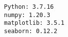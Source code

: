 \documentclass[11pt,a4paper]{article}
\begin{document}
    \begin{Verbatim}[commandchars=\\\{\}]
Python: 3.7.16
numpy: 1.20.3
matplotlib: 3.5.1
seaborn: 0.12.2
    \end{Verbatim}


\end{document}
